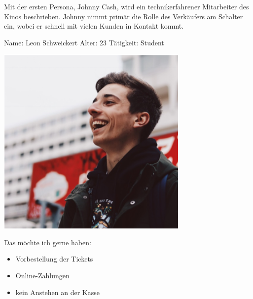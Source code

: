 Mit der ersten Persona, Johnny Cash, wird ein technikerfahrener Mitarbeiter des Kinos beschrieben.
Johnny nimmt primär die Rolle des Verkäufers am Schalter ein, wobei er schnell mit vielen Kunden in Kontakt kommt.

\newpage
{}
\begin{minipage}[t]{0.5\textwidth} 	\vspace{0.2\baselineskip} %
	\begin{entrylist}
		\entry
		{Name:}
		{Leon Schweickert}
		\entry
		{Alter:}
		{23}
		\entry
		{Tätigkeit:}
		{Student}
	\end{entrylist}
	\begin{barchart}{5.0}\hspace{-1mm}
	\end{barchart}
\end{minipage}
\hfil
\begin{minipage}[t]{0.4\textwidth} 	\vspace{0.0\baselineskip} %
	\flushright
	\includegraphics[width=0.70\textwidth]{img/personas/leon}
\end{minipage}

Das möchte ich gerne haben:
\begin{itemize}
	\item Vorbestellung der Tickets
	\item Online-Zahlungen
	\item kein Anstehen an der Kasse
\end{itemize}

